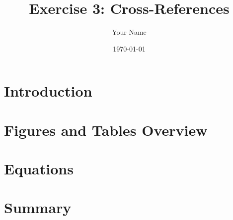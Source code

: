 \documentclass{article}
\title{Exercise 3: Cross-References}
\author{Your Name}
\date{\today}
\begin{document}
\maketitle

\section{Introduction}\label{sec:intro}

\section{Figures and Tables Overview}\label{sec:overview}

\section{Equations}\label{sec:eqs}

\section{Summary}
\end{document}

